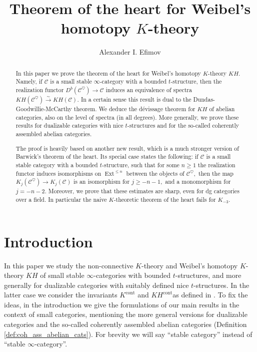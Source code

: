 \documentclass[11pt,leqno]{amsart}
\title[Theorem of the heart for Weibel's homotopy $K$-theory]
{Theorem of the heart for Weibel's homotopy $K$-theory}
\author{Alexander I. Efimov}
\numberwithin{equation}{section}
\newcommand{\xto}{\xrightarrow}
\newcommand{\cont}{\operatorname{cont}}
\newcommand{\cC}{{\mathcal C}}
\newcommand{\Ext}{\operatorname{Ext}}
\begin{document}
\begin{abstract}In this paper we prove the theorem of the heart for Weibel's homotopy $K$-theory $KH.$ Namely, if $\cC$ is a small stable $\infty$-category with a bounded $t$-structure, then the realization functor $D^b(\cC^{\heartsuit})\to \cC$ induces an equivalence of spectra $KH(\cC^{\heartsuit})\xto{\sim}KH(\cC).$ In a certain sense this result is dual to the Dundas-Goodwillie-McCarthy theorem. We deduce the d\'evissage theorem for $KH$ of abelian categories, also on the level of spectra (in all degrees). More generally, we prove these results for dualizable categories with nice $t$-structures and for the so-called coherently assembled abelian categories.
	
The proof is heavily based on another new result, which is a much stronger version of Barwick's theorem of the heart. Its special case states the following: if $\cC$ is a small stable category with a bounded $t$-structure, such that for some $n\geq 1$ the realization functor induces isomorphisms on $\Ext^{\leq n}$ between the objects of $\cC^{\heartsuit},$ then the map $K_j(\cC^{\heartsuit})\to K_j(\cC)$ is an isomorphism for $j\geq -n-1,$ and a monomorphism for $j=-n-2.$ Moreover, we prove that these estimates are sharp, even for dg categories over a field. In particular the naive $K$-theoretic theorem of the heart fails for $K_{-3}.$
\end{abstract}


\maketitle

\tableofcontents

\section{Introduction}

In this paper we study the non-connective $K$-theory and Weibel's homotopy $K$-theory $KH$ of small stable $\infty$-categories with bounded $t$-structures, and more generally for dualizable categories with suitably defined nice $t$-structures. In the latter case we consider the invariants $K^{\cont}$ and $KH^{\cont} $as defined in \cite{E24}. To fix the ideas, in the introduction we give the formulations of our main results in the context of small categories, mentioning the more general versions for dualizable categories and the so-called coherently assembled abelian categories (Definition \ref{def:coh_ass_abelian_cats}). For brevity we will say ``stable category'' instead of ``stable $\infty$-category''.
\end{document}
